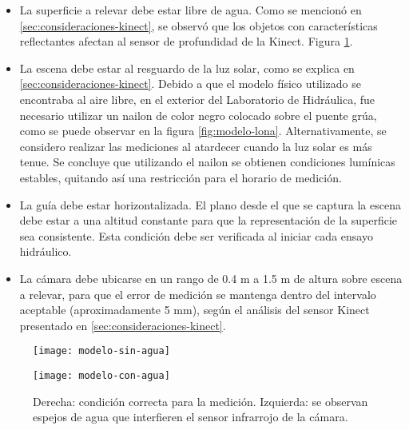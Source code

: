 \begin{itemize}

\item La superficie a relevar debe estar libre de agua. Como se mencionó en \ref{sec:consideraciones-kinect}, se observó que los objetos con características reflectantes afectan al sensor de profundidad de la Kinect. Figura \ref{fig:modelo-condiciones-agua}.

\item La escena debe estar al resguardo de la luz solar, como se explica en \ref{sec:consideraciones-kinect}. Debido a que el modelo físico utilizado se encontraba al aire libre, en el exterior del Laboratorio de Hidráulica, fue necesario utilizar un nailon de color negro colocado sobre el puente grúa, como se puede observar en la figura \ref{fig:modelo-lona}. Alternativamente, se considero realizar las mediciones al atardecer cuando la luz solar es más tenue. Se concluye que utilizando el nailon se obtienen condiciones lumínicas estables, quitando así una restricción para el horario de medición.

\item La guía debe estar horizontalizada. El plano desde el que se captura la escena debe estar a una altitud constante para que la representación de la superficie sea consistente. Esta condición debe ser verificada al iniciar cada ensayo hidráulico.

\item La cámara debe ubicarse en un rango de 0.4 m  a 1.5 m de altura sobre escena a relevar, para que el error de medición se mantenga dentro del intervalo aceptable (aproximadamente 5 mm), según el análisis del sensor Kinect presentado en \ref{sec:consideraciones-kinect}.

\end{itemize}

\begin{figure}[ht]
\centering
\begin{minipage}[t]{.45\textwidth}
\begin{center}
\texttt{[image: modelo-sin-agua]} %
\end{center}
\end{minipage}
\hfill
\begin{minipage}[t]{.45\textwidth}
\begin{center}
\texttt{[image: modelo-con-agua]} %
\end{center}
\end{minipage}
\hfill
\caption[Modelo físico con y sin agua sobre la superficie]{Derecha: condición correcta para la medición. Izquierda: se observan espejos de agua que interfieren el sensor infrarrojo de la cámara.}
\label{fig:modelo-condiciones-agua}
\end{figure}

